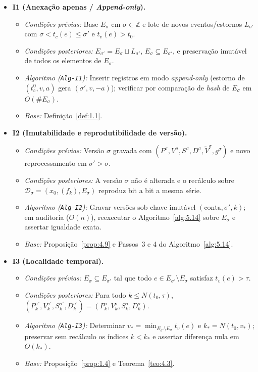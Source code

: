 \documentclass[11pt, a4paper]{article}
\theoremstyle{definition}
\theoremstyle{plain}
\theoremstyle{remark}
\begin{document}
\begin{itemize}
    \item \textbf{I1 (Anexação apenas / \emph{Append-only}).}
    \begin{itemize}
        \item \emph{Condições prévias:} Base $E_\sigma$ em $\sigma \in \mathbb{Z}$ e lote de novos eventos/estornos $L_{\sigma'}$ com $\sigma < t_c(e) \le \sigma'$ e $t_v(e) > t_0$.
        \item \emph{Condições posteriores:} $E_{\sigma'} = E_\sigma \sqcup L_{\sigma'}$, $E_\sigma \subseteq E_{\sigma'}$, e preservação imutável de todos os elementos de $E_\sigma$.
        \item \emph{Algoritmo (\texttt{Alg-I1}):} Inserir registros em modo \emph{append-only} (estorno de $(t_c^0, v, a)$ gera $(\sigma', v, -a)$); verificar por comparação de \emph{hash} de $E_\sigma$ em $O(\#E_\sigma)$.
        \item \emph{Base:} Definição~\ref{def:1.1}.
    \end{itemize}

    \item \textbf{I2 (Imutabilidade e reprodutibilidade de versão).}
    \begin{itemize}
        \item \emph{Condições prévias:} Versão $\sigma$ gravada com $(P^\sigma, V^\sigma, S^\sigma, D^\sigma, \tilde{V}^\sigma, g^\sigma)$ e novo reprocessamento em $\sigma' > \sigma$.
        \item \emph{Condições posteriores:} A versão $\sigma$ não é alterada e o recálculo sobre $\mathcal{D}_\sigma = (x_0, (f_k), E_\sigma)$ reproduz bit a bit a mesma série.
        \item \emph{Algoritmo (\texttt{Alg-I2}):} Gravar versões sob chave imutável $(\text{conta}, \sigma', k)$; em auditoria ($O(n)$), reexecutar o Algoritmo~\ref{alg:5.14} sobre $E_\sigma$ e assertar igualdade exata.
        \item \emph{Base:} Proposição~\ref{prop:4.9} e Passos~3 e 4 do Algoritmo~\ref{alg:5.14}.
    \end{itemize}

    \item \textbf{I3 (Localidade temporal).}
    \begin{itemize}
        \item \emph{Condições prévias:} $E_\sigma \subseteq E_{\sigma'}$ tal que todo $e \in E_{\sigma'} \setminus E_\sigma$ satisfaz $t_v(e) > \tau$.
        \item \emph{Condições posteriores:} Para todo $k \le N(t_0, \tau)$, $(P_k^{\sigma'}, V_k^{\sigma'}, S_k^{\sigma'}, D_k^{\sigma'}) = (P_k^\sigma, V_k^\sigma, S_k^\sigma, D_k^\sigma)$.
        \item \emph{Algoritmo (\texttt{Alg-I3}):} Determinar $v_* = \min_{E_{\sigma'}\setminus E_\sigma} t_v(e)$ e $k_* = N(t_0, v_*)$; preservar sem recálculo os índices $k < k_*$ e assertar diferença nula em $O(k_*)$.
        \item \emph{Base:} Proposição~\ref{prop:1.4} e Teorema~\ref{teo:4.3}.
    \end{itemize}


\end{itemize}
\end{document}
